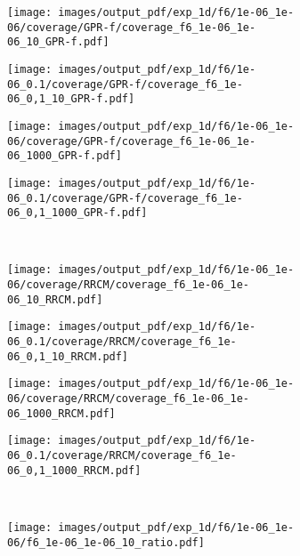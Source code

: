 \documentclass[a4paper,14pt]{extarticle}
\begin{document}
\begin{figure}%
  \centering
  \begin{subfigure}[b]{0.25\linewidth}
    \texttt{[image: images/output\_pdf/exp\_1d/f6/1e-06\_1e-06/coverage/GPR-f/coverage\_f6\_1e-06\_1e-06\_10\_GPR-f.pdf]}
  \end{subfigure}%
  \begin{subfigure}[b]{0.25\linewidth}
    \texttt{[image: images/output\_pdf/exp\_1d/f6/1e-06\_0.1/coverage/GPR-f/coverage\_f6\_1e-06\_0,1\_10\_GPR-f.pdf]}
  \end{subfigure}%
  \begin{subfigure}[b]{0.25\linewidth}
    \texttt{[image: images/output\_pdf/exp\_1d/f6/1e-06\_1e-06/coverage/GPR-f/coverage\_f6\_1e-06\_1e-06\_1000\_GPR-f.pdf]}
  \end{subfigure}%
  \begin{subfigure}[b]{0.25\linewidth}
    \texttt{[image: images/output\_pdf/exp\_1d/f6/1e-06\_0.1/coverage/GPR-f/coverage\_f6\_1e-06\_0,1\_1000\_GPR-f.pdf]}
  \end{subfigure}\\
  \begin{subfigure}[b]{0.25\linewidth}
    \texttt{[image: images/output\_pdf/exp\_1d/f6/1e-06\_1e-06/coverage/RRCM/coverage\_f6\_1e-06\_1e-06\_10\_RRCM.pdf]}
  \end{subfigure}%
  \begin{subfigure}[b]{0.25\linewidth}
    \texttt{[image: images/output\_pdf/exp\_1d/f6/1e-06\_0.1/coverage/RRCM/coverage\_f6\_1e-06\_0,1\_10\_RRCM.pdf]}
  \end{subfigure}%
  \begin{subfigure}[b]{0.25\linewidth}
    \texttt{[image: images/output\_pdf/exp\_1d/f6/1e-06\_1e-06/coverage/RRCM/coverage\_f6\_1e-06\_1e-06\_1000\_RRCM.pdf]}
  \end{subfigure}%
  \begin{subfigure}[b]{0.25\linewidth}
    \texttt{[image: images/output\_pdf/exp\_1d/f6/1e-06\_0.1/coverage/RRCM/coverage\_f6\_1e-06\_0,1\_1000\_RRCM.pdf]}
  \end{subfigure}\\
  \begin{subfigure}[b]{0.25\linewidth}
    \texttt{[image: images/output\_pdf/exp\_1d/f6/1e-06\_1e-06/f6\_1e-06\_1e-06\_10\_ratio.pdf]}
    \caption{} \label{fig:f6_1d_low_noise_arb_c1}
  \end{subfigure}%

\end{figure}
\end{document}
